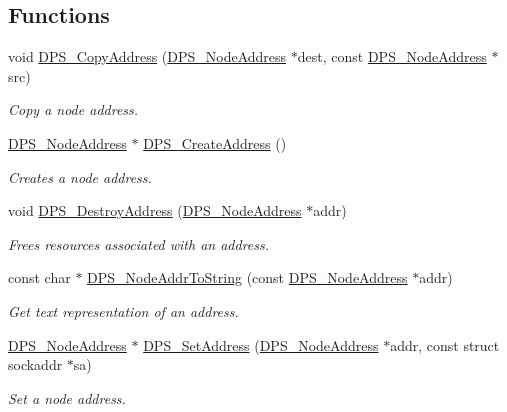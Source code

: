 \subsection*{Functions}
\begin{DoxyCompactItemize}
\item 
void \hyperlink{group__nodeaddress_gace91591af9bf2a99bad07deda1b9176c}{D\+P\+S\+\_\+\+Copy\+Address} (\hyperlink{group__nodeaddress_ga9e9f56aa38e82b4edcef7eb81e9f5bd2}{D\+P\+S\+\_\+\+Node\+Address} $\ast$dest, const \hyperlink{group__nodeaddress_ga9e9f56aa38e82b4edcef7eb81e9f5bd2}{D\+P\+S\+\_\+\+Node\+Address} $\ast$src)
\begin{DoxyCompactList}\small\item\em Copy a node address. \end{DoxyCompactList}\item 
\hyperlink{group__nodeaddress_ga9e9f56aa38e82b4edcef7eb81e9f5bd2}{D\+P\+S\+\_\+\+Node\+Address} $\ast$ \hyperlink{group__nodeaddress_ga6bed18a4b0ad533ec88c7a0d376de818}{D\+P\+S\+\_\+\+Create\+Address} ()
\begin{DoxyCompactList}\small\item\em Creates a node address. \end{DoxyCompactList}\item 
void \hyperlink{group__nodeaddress_ga1f373831e8009ff5959ccb02b8c3fb14}{D\+P\+S\+\_\+\+Destroy\+Address} (\hyperlink{group__nodeaddress_ga9e9f56aa38e82b4edcef7eb81e9f5bd2}{D\+P\+S\+\_\+\+Node\+Address} $\ast$addr)
\begin{DoxyCompactList}\small\item\em Frees resources associated with an address. \end{DoxyCompactList}\item 
const char $\ast$ \hyperlink{group__nodeaddress_gafc7b21048f92370ca29325d6245b576d}{D\+P\+S\+\_\+\+Node\+Addr\+To\+String} (const \hyperlink{group__nodeaddress_ga9e9f56aa38e82b4edcef7eb81e9f5bd2}{D\+P\+S\+\_\+\+Node\+Address} $\ast$addr)
\begin{DoxyCompactList}\small\item\em Get text representation of an address. \end{DoxyCompactList}\item 
\hyperlink{group__nodeaddress_ga9e9f56aa38e82b4edcef7eb81e9f5bd2}{D\+P\+S\+\_\+\+Node\+Address} $\ast$ \hyperlink{group__nodeaddress_ga6231c243c483bd2d282f7df734a98946}{D\+P\+S\+\_\+\+Set\+Address} (\hyperlink{group__nodeaddress_ga9e9f56aa38e82b4edcef7eb81e9f5bd2}{D\+P\+S\+\_\+\+Node\+Address} $\ast$addr, const struct sockaddr $\ast$sa)
\begin{DoxyCompactList}\small\item\em Set a node address. \end{DoxyCompactList}\end{DoxyCompactItemize}


